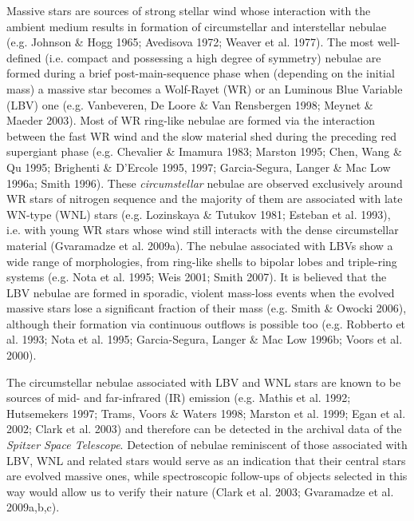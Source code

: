 \documentclass[useAMS]{mn2e}
\begin{document}
Massive stars are sources of strong stellar wind whose interaction
with the ambient medium results in formation of circumstellar and
interstellar nebulae (e.g. Johnson \& Hogg 1965; Avedisova 1972;
Weaver et al. 1977). The most well-defined (i.e. compact and
possessing a high degree of symmetry) nebulae are formed during a
brief post-main-sequence phase when (depending on the initial mass)
a massive star becomes a Wolf-Rayet (WR) or an Luminous Blue
Variable (LBV) one (e.g. Vanbeveren, De Loore \& Van Rensbergen
1998; Meynet \& Maeder 2003). Most of WR ring-like nebulae are
formed via the interaction between the fast WR wind and the slow
material shed during the preceding red supergiant phase (e.g.
Chevalier \& Imamura 1983; Marston 1995; Chen, Wang \& Qu 1995;
Brighenti \& D'Ercole 1995, 1997; Garcia-Segura, Langer \& Mac Low
1996a; Smith 1996). These {\it circumstellar} nebulae are observed
exclusively around WR stars of nitrogen sequence and the majority of
them are associated with late WN-type (WNL) stars (e.g. Lozinskaya
\& Tutukov 1981; Esteban et al. 1993), i.e. with young WR stars
whose wind still interacts with the dense circumstellar material
(Gvaramadze et al. 2009a). The nebulae associated with LBVs show a
wide range of morphologies, from ring-like shells to bipolar lobes
and triple-ring systems (e.g. Nota et al. 1995; Weis 2001; Smith
2007). It is believed that the LBV nebulae are formed in sporadic,
violent mass-loss events when the evolved massive stars lose a
significant fraction of their mass (e.g. Smith \& Owocki 2006),
although their formation via continuous outflows is possible too
(e.g. Robberto et al. 1993; Nota et al. 1995; Garcia-Segura, Langer
\& Mac Low 1996b; Voors et al. 2000).

The circumstellar nebulae associated with LBV and WNL stars are
known to be sources of mid- and far-infrared (IR) emission (e.g.
Mathis et al. 1992; Hutsemekers 1997; Trams, Voors \& Waters 1998;
Marston et al. 1999; Egan et al. 2002; Clark et al. 2003) and
therefore can be detected in the archival data of the {\it Spitzer
Space Telescope}. Detection of nebulae reminiscent of those
associated with LBV, WNL and related stars would serve as an
indication that their central stars are evolved massive ones, while
spectroscopic follow-ups of objects selected in this way would allow
us to verify their nature (Clark et al. 2003; Gvaramadze et al.
2009a,b,c).
\end{document}
